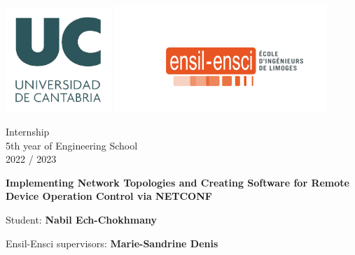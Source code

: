 \begin{titlepage}
    \begin{center}
        \includegraphics[width=0.3\textwidth]{Images/UC_logo.jpg} \hfill
        \includegraphics[width=0.6\textwidth]{Images/ENSIL2.png}
        

        \vspace*{0.5cm}
        
    \end{center}
        
    \begin{flushleft}
        \huge
        
        Internship\\
        5th year of Engineering School\\
        2022 / 2023\\
    \end{flushleft}

    \begin{center}
        
    
        \vspace{1cm}
            
        \Huge
        \textbf{Implementing Network Topologies and Creating Software for Remote Device Operation Control via NETCONF}
                    
        \vspace{2cm}
            
        
        \large
        Student:
        \textbf{Nabil Ech-Chokhmany}

        \vspace{0.5cm}

        Ensil-Ensci supervisors:
        \textbf{Marie-Sandrine Denis}


\end{center}
\end{titlepage}
